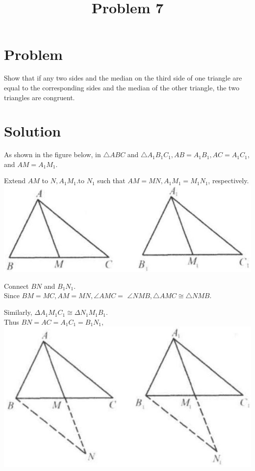 \documentclass{article}
\title{Problem 7}
\date{}
\begin{document}
\maketitle

\section*{Problem}
Show that if any two sides and the median on the third side of one triangle are equal to the corresponding sides and the median of the other triangle, the two triangles are congruent.

\section*{Solution}
As shown in the figure below, in \(\triangle A B C\) and \(\triangle A_{1} B_{1} C_{1}, A B=A_{1} B_{1}, A C=A_{1} C_{1}\), and \(A M=A_{1} M_{1}\).

Extend \(A M\) to \(N, A_{1} M_{1}\).to \(N_{1}\) such that \(A M=M N, A_{1} M_{1}=M_{1} N_{1}\), respectively.\\
\centering
\includegraphics[width=\textwidth]{images/031.jpg}

Connect \(B N\) and \(B_{1} N_{1}\).\\
Since \(B M=M C, A M=M N, \angle A M C=\) \(\angle N M B, \triangle A M C \cong \triangle N M B\).

Similarly, \(\Delta A_{1} M_{1} C_{1} \cong \Delta N_{1} M_{1} B_{1}\).\\
Thus \(B N=A C=A_{1} C_{1}=B_{1} N_{1}\),\\
\centering
\includegraphics[width=\textwidth]{images/031(1).jpg}
\end{document}
